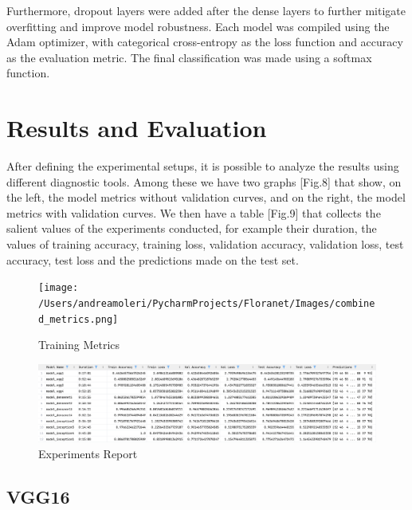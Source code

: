 Furthermore, dropout layers were added after the dense layers to further mitigate overfitting and improve model
robustness. Each model was compiled using the Adam optimizer, with categorical cross-entropy as the loss function and
accuracy as the evaluation metric. The final classification was made using a softmax function.


\section{Results and Evaluation}

After defining the experimental setups, it is possible to analyze the results using different diagnostic tools.
Among these we have two graphs [Fig.8] that show, on the left, the model metrics without validation curves, and on
the right, the model metrics with validation curves. We then have a table [Fig.9] that collects the salient values
of the experiments conducted, for example their duration, the values ​​of training accuracy, training loss,
validation accuracy, validation loss, test accuracy, test loss and the predictions made on the test set.

\begin{figure}[h!]
    \centering
    \texttt{[image: /Users/andreamoleri/PycharmProjects/Floranet/Images/combined\_metrics.png]}
    \caption{Training Metrics}
\end{figure}

\begin{figure}[h!]
    \centering
    \includegraphics[width=\linewidth]{Images/Report}
    \caption{Experiments Report}
\end{figure}

\subsection{VGG16}

